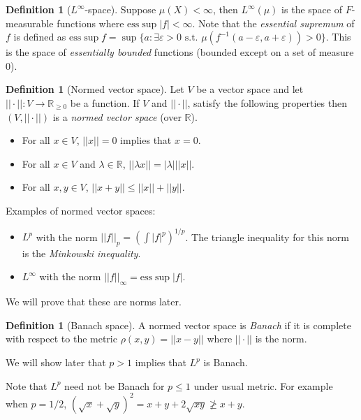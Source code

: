 \documentclass{article}
\theoremstyle{definition}
\newtheorem{definition}[theorem]{Definition}
\begin{document}
\begin{definition}[\(L^\infty \)-space]
    Suppose \(\mu(X)<\infty \), then \(L^\infty(\mu)\) is the space of \(F\)-measurable functions where
    \(\text{ess}\sup |f|<\infty \). Note that the \textit{essential supremum} of \(f\) is defined as
    \(\text{ess}\sup f=\sup \{a:\exists\varepsilon>0\text{ s.t. } \mu(f^{-1}(a-\varepsilon,a+\varepsilon))>0\} \).
    This is the space of \textit{essentially bounded} functions (bounded except on a set of measure 0).
\end{definition}

\begin{definition}[Normed vector space]
    Let \(V\) be a vector space and let \(||\cdot||:V\rightarrow\mathbb{R}_{\geq0}\) be a function. If \(V\) and \(||\cdot||\),
    satisfy the following properties then \((V,||\cdot||)\) is a \textit{normed vector space} (over \(\mathbb{R} \)). 
    \begin{itemize}
        \item For all \(x\in V\), \(||x||=0\) implies that \(x=0\).
        \item For all \(x\in V\) and \(\lambda\in\mathbb{R} \), \(||\lambda x||=|\lambda| ||x||\).
        \item For all \(x,y\in V\), \(||x+y||\leq ||x||+||y||\).
    \end{itemize}
\end{definition}

Examples of normed vector spaces:
\begin{itemize}
    \item \(L^p\) with the norm \(||f||_p={\left(\int|f|^p \right)}^{1/p}\). The triangle inequality for this norm is
    the \textit{Minkowski inequality}.
    \item \(L^\infty \) with the norm \(||f||_\infty =\text{ess}\sup |f|\).
\end{itemize}
We will prove that these are norms later.

\begin{definition}[Banach space]
    A normed vector space is \textit{Banach} if it is complete with respect to the metric \(\rho(x,y)=||x-y||\) where
    \(||\cdot||\) is the norm.
\end{definition}

We will show later that \(p>1\) implies that \(L^p\) is Banach.

Note that \(L^p\) need not be Banach for \(p\leq 1\) under usual metric. For example when \(p=1/2\),
\({(\sqrt{x}+\sqrt{y})}^2=x+y+2\sqrt{xy}\not\geq x+y\).
\end{document}
